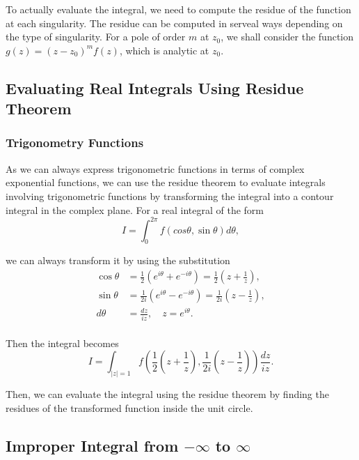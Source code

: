 \documentclass{article}
\begin{document}
To actually evaluate the integral, we need to compute the residue of the function at each singularity. The residue can be computed in serveal ways depending on the type of singularity. For a pole of order $m$ at $z_0$, we shall consider the function $g(z) = (z-z_0)^m f(z)$, which is analytic at $z_0$.

\subsection{Evaluating Real Integrals Using Residue Theorem}
\subsubsection{Trigonometry Functions}

As we can always express trigonometric functions in terms of complex exponential functions, we can use the residue theorem to evaluate integrals involving trigonometric functions by transforming the integral into a contour integral in the complex plane. For a real integral of the form
\begin{equation}
    I = \int_0^{2\pi} f(cos\theta, \sin\theta) d\theta,
\end{equation}

we can always transform it by using the substitution
\begin{equation}
    \begin{split}
    \cos\theta &= \frac{1}{2}(e^{i\theta} + e^{-i\theta}) = \frac{1}{2}\left(z + \frac{1}{z}\right),\\
    \sin\theta &= \frac{1}{2i}(e^{i\theta} - e^{-i\theta}) = \frac{1}{2i}\left(z - \frac{1}{z}\right),\\
    d\theta &= \frac{dz}{iz}, \quad z = e^{i\theta}.\\
    \end{split}
\end{equation}

Then the integral becomes
\begin{equation}
    I  = \int_{|z|=1} f\left(\frac{1}{2}\left(z + \frac{1}{z}\right), \frac{1}{2i}\left(z - \frac{1}{z}\right)\right) \frac{dz}{iz}.
\end{equation}

Then, we can evaluate the integral using the residue theorem by finding the residues of the transformed function inside the unit circle.

\subsection{Improper Integral from $-\infty$ to $\infty$}
\end{document}
